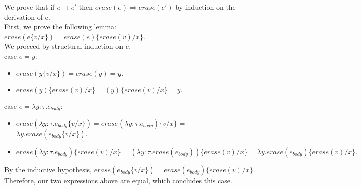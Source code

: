 \documentclass[10pt]{article}
\begin{document}
\begin{exercise}
%
%
We prove that if $e \rightarrow e'$ then
$\mathit{erase}(e) \Rightarrow \mathit{erase}(e')$ by induction on the derivation of e.\\

First, we prove the following lemma: $\mathit{erase}(e\{v/x\}) = \mathit{erase}(e)\{\mathit{erase}(v)/x\}$.\\
We proceed by structural induction on $e.$\\

{\sc case} $e = y$:
\begin{itemize}
\item $\mathit{erase}(y \{v/x\}) = \mathit{erase}(y) = y.$
\item $\mathit{erase}(y) \{\mathit{erase}(v) /x\} = (y)\{\mathit{erase} (v)/x\} = y.$\\

\checkmark
\end{itemize}

{\sc case} $e = \lambda y: \tau. e_{body}$:
\begin{itemize}
\item $\mathit{erase}(\lambda y: \tau. e_{body} \{v/x\}) = \mathit{erase}(\lambda y: \tau. e_{body})\{v/x\}$ 
= $\lambda y. \mathit{erase}(e_{body} \{v/x\}).$\\
\item $\mathit{erase}(\lambda y: \tau. e_{body}) \{\mathit{erase}(v)/x\} = (\lambda y: \tau. \mathit{erase} (e_{body})) \{\mathit{erase}(v)/x\} = \lambda y. \mathit{erase} (e_{body}) \{\mathit{erase} (v)/x\}.$\\

\end{itemize}

By the inductive hypothesis, $\mathit{erase}(e_{body}\{v/x\}) = \mathit{erase}(e_{body})\{\mathit{erase}(v)/x\}$. Therefore, our two expressions above are equal, which concludes this case. \checkmark\\


\end{exercise}
\end{document}
